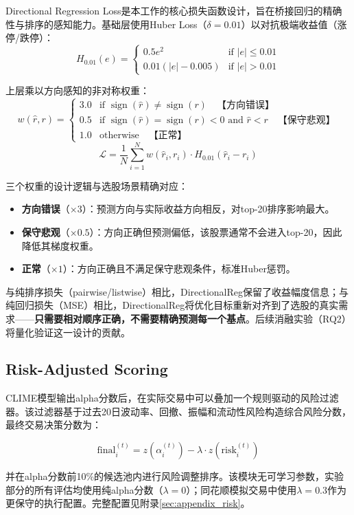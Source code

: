 Directional Regression Loss是本工作的核心损失函数设计，旨在桥接回归的精确性与排序的感知能力。基础层使用Huber Loss（$\delta=0.01$）以对抗极端收益值（涨停/跌停）：
\begin{equation}
H_{0.01}(e) = \begin{cases}
0.5 e^2 & \text{if } |e| \leq 0.01 \\
0.01(|e| - 0.005) & \text{if } |e| > 0.01
\end{cases}
\end{equation}

上层乘以方向感知的非对称权重：
\begin{equation}
w(\hat{r}, r) = \begin{cases}
3.0 & \text{if } \operatorname{sign}(\hat{r}) \neq \operatorname{sign}(r) \quad \text{【方向错误】}\\
0.5 & \text{if } \operatorname{sign}(\hat{r}) = \operatorname{sign}(r) < 0 \text{ and } \hat{r} < r \quad \text{【保守悲观】}\\
1.0 & \text{otherwise} \quad \text{【正常】}
\end{cases}
\end{equation}
\begin{equation}
\mathcal{L} = \frac{1}{N}\sum_{i=1}^{N} w(\hat{r}_i, r_i) \cdot H_{0.01}(\hat{r}_i - r_i)
\end{equation}

三个权重的设计逻辑与选股场景精确对应：
\begin{itemize}[leftmargin=*, itemsep=2pt]
    \item \textbf{方向错误}（$\times 3$）：预测方向与实际收益方向相反，对top-20排序影响最大。
    \item \textbf{保守悲观}（$\times 0.5$）：方向正确但预测偏低，该股票通常不会进入top-20，因此降低其梯度权重。
    \item \textbf{正常}（$\times 1$）：方向正确且不满足保守悲观条件，标准Huber惩罚。
\end{itemize}

与纯排序损失（pairwise/listwise）相比，DirectionalReg保留了收益幅度信息；与纯回归损失（MSE）相比，DirectionalReg将优化目标重新对齐到了选股的真实需求——\textbf{只需要相对顺序正确，不需要精确预测每一个基点}。后续消融实验（RQ2）将量化验证这一设计的贡献。

\subsection{Risk-Adjusted Scoring}
\label{sec:risk}

CLIME模型输出alpha分数后，在实际交易中可以叠加一个规则驱动的风险过滤器。该过滤器基于过去20日波动率、回撤、振幅和流动性风险构造综合风险分数，最终交易决策分数为：

\begin{equation}
\text{final}_i^{(t)} = z(\alpha_i^{(t)}) - \lambda \cdot z(\text{risk}_i^{(t)})
\end{equation}

并在alpha分数前10\%的候选池内进行风险调整排序。该模块无可学习参数，实验部分的所有评估均使用纯alpha分数（$\lambda = 0$）；同花顺模拟交易中使用$\lambda=0.3$作为更保守的执行配置。完整配置见附录\ref{sec:appendix_risk}。
